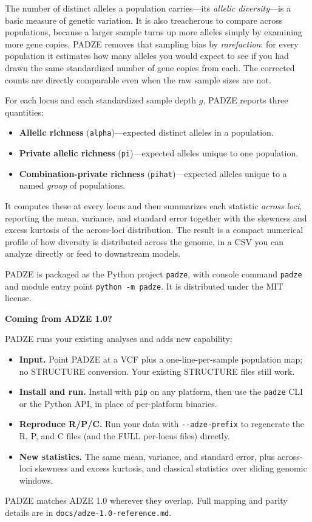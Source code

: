 \documentclass[11pt]{article}
\newenvironment{callout}[1]{%
  \par\medskip\noindent
  \setlength{\fboxsep}{10pt}%
  \setlength{\fboxrule}{0.8pt}%
  \begin{lrbox}{\calloutbox}%
  \begin{minipage}{\dimexpr\textwidth-2\fboxsep-2\fboxrule\relax}%
    \small
    \textbf{\large #1}\par\smallskip
}{%
  \end{minipage}%
  \end{lrbox}%
  \noindent\fcolorbox{calloutrule}{calloutbg}{\usebox{\calloutbox}}%
  \par\medskip
}
\newcommand{\padze}{PADZE}
\begin{document}
The number of distinct alleles a population carries---its \emph{allelic
diversity}---is a basic measure of genetic variation. It is also treacherous to
compare across populations, because a larger sample turns up more alleles simply
by examining more gene copies. \padze{} removes that sampling bias by
\emph{rarefaction}: for every population it estimates how many alleles you would
expect to see if you had drawn the same standardized number of gene copies from
each. The corrected counts are directly comparable even when the raw sample
sizes are not.

For each locus and each standardized sample depth \(g\), \padze{} reports three
quantities:

\begin{itemize}
  \item \textbf{Allelic richness} (\texttt{alpha})---expected distinct alleles
        in a population.
  \item \textbf{Private allelic richness} (\texttt{pi})---expected alleles
        unique to one population.
  \item \textbf{Combination-private richness} (\texttt{pihat})---expected
        alleles unique to a named \emph{group} of populations.
\end{itemize}

It computes these at every locus and then summarizes each statistic
\emph{across loci}, reporting the mean, variance, and standard error together
with the skewness and excess kurtosis of the across-loci distribution. The
result is a compact numerical profile of how diversity is distributed across the
genome, in a CSV you can analyze directly or feed to downstream models.

\padze{} is packaged as the Python project \texttt{padze}, with console command
\texttt{padze} and module entry point \texttt{python -m padze}. It is
distributed under the MIT license.

\begin{callout}{Coming from ADZE 1.0?}
\padze{} runs your existing analyses and adds new capability:
\begin{itemize}
  \setlength{\itemsep}{2pt}
  \item \textbf{Input.} Point \padze{} at a VCF plus a one-line-per-sample
        population map; no STRUCTURE conversion. Your existing STRUCTURE files
        still work.
  \item \textbf{Install and run.} Install with \texttt{pip} on any platform,
        then use the \texttt{padze} CLI or the Python API, in place of
        per-platform binaries.
  \item \textbf{Reproduce R/P/C.} Run your data with \texttt{-{}-adze-prefix} to
        regenerate the R, P, and C files (and the FULL per-locus files)
        directly.
  \item \textbf{New statistics.} The same mean, variance, and standard error,
        plus across-loci skewness and excess kurtosis, and classical statistics
        over sliding genomic windows.
\end{itemize}
\padze{} matches ADZE 1.0 wherever they overlap. Full mapping and parity
details are in \texttt{docs/adze-1.0-reference.md}.
\end{callout}
\end{document}

